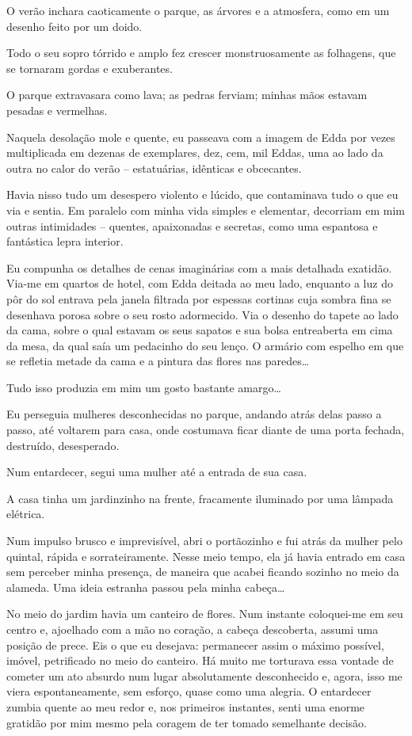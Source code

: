 O verão inchara caoticamente o parque, as árvores e a atmosfera, como em um desenho feito por um doido.

Todo o seu sopro tórrido e amplo fez crescer monstruosamente as folhagens, que se tornaram gordas e exuberantes.

O parque extravasara como lava; as pedras ferviam; minhas mãos estavam pesadas e vermelhas.

Naquela desolação mole e quente, eu passeava com a imagem de Edda por vezes multiplicada em dezenas de exemplares, dez, cem, mil Eddas, uma ao lado da outra no calor do verão -- estatuárias, idênticas e obcecantes.

Havia nisso tudo um desespero violento e lúcido, que contaminava tudo o que eu via e sentia. Em paralelo com minha vida simples e elementar, decorriam em mim outras intimidades -- quentes, apaixonadas e secretas, como uma espantosa e fantástica lepra interior.

Eu compunha os detalhes de cenas imaginárias com a mais detalhada exatidão. Via-me em quartos de hotel, com Edda deitada ao meu lado, enquanto a luz do pôr do sol entrava pela janela filtrada por espessas cortinas cuja sombra fina se desenhava porosa sobre o seu rosto adormecido. Via o desenho do tapete ao lado da cama, sobre o qual estavam os seus sapatos e sua bolsa entreaberta em cima da mesa, da qual saía um pedacinho do seu lenço. O armário com espelho em que se refletia metade da cama e a pintura das flores nas paredes\dots

Tudo isso produzia em mim um gosto bastante amargo\dots

Eu perseguia mulheres desconhecidas no parque, andando atrás delas passo a passo, até voltarem para casa, onde costumava ficar diante de uma porta fechada, destruído, desesperado.

Num entardecer, segui uma mulher até a entrada de sua casa.

A casa tinha um jardinzinho na frente, fracamente iluminado por uma lâmpada elétrica.

Num impulso brusco e imprevisível, abri o portãozinho e fui atrás da mulher pelo quintal, rápida e sorrateiramente. Nesse meio tempo, ela já havia entrado em casa sem perceber minha presença, de maneira que acabei ficando sozinho no meio da alameda. Uma ideia estranha passou pela minha cabeça\dots

No meio do jardim havia um canteiro de flores. Num instante coloquei-me em seu centro e, ajoelhado com a mão no coração, a cabeça descoberta, assumi uma posição de prece. Eis o que eu desejava: permanecer assim o máximo possível, imóvel, petrificado no meio do canteiro. Há muito me torturava essa vontade de cometer um ato absurdo num lugar absolutamente desconhecido e, agora, isso me viera espontaneamente, sem esforço, quase como uma alegria. O entardecer zumbia quente ao meu redor e, nos primeiros instantes, senti uma enorme gratidão por mim mesmo pela coragem de ter tomado semelhante decisão.

